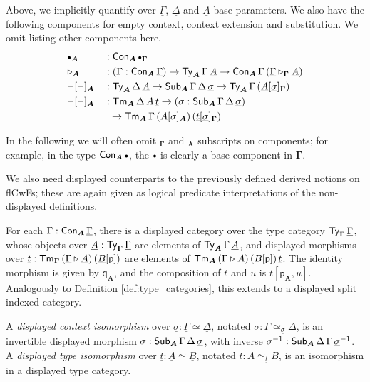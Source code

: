 \documentclass[sigplan,review,anonymous]{acmart}\settopmatter{printfolios=true,printccs=false,printacmref=false}
\newcommand{\ext}{\triangleright}
\newcommand{\emptycon}{\scaleobj{.75}\bullet}
\newcommand{\p}{\mathsf{p}}
\newcommand{\q}{\mathsf{q}}
\newcommand{\bGamma}{\boldsymbol{\Gamma}}
\newcommand{\bA}{\boldsymbol{A}}
\newcommand{\ul}[1]{\underline{#1}}
\newcommand{\ulGamma}{\ul{\Gamma}}
\newcommand{\ulDelta}{\ul{\Delta}}
\newcommand{\ulsigma}{\ul{\sigma}}
\newcommand{\ult}{\ul{t}}
\newcommand{\ulA}{\ul{A}}
\newcommand{\ulB}{\ul{B}}
\begin{document}
\begin{definition}
Above, we implicitly quantify over $\ulGamma$, $\ulDelta$ and $\ulA$ base
parameters. We also have the following components for empty context, context
extension and substitution. We omit listing other components here.
\begin{alignat*}{3}
  & \emptycon_{\bA} && : \Con_{\bA}\,\emptycon_{\bGamma}\\
  & \ext_{\bA}      && : (\Gamma : \Con_{\bA}\,\ulGamma)\ra \Ty_{\bA}\,\Gamma\,\ulA \ra
                     \Con_{\bA}\,\Gamma\,(\ulGamma \ext_{\bGamma} \ulA)\\
  & \blank[\blank]_{\bA} && : \Ty_{\bA}\,\Delta\,\ulA \ra \Sub_{\bA}\,\Gamma\,\Delta\,\ulsigma
                     \ra \Ty_{\bA}\,\Gamma\, (\ulA[\ulsigma]_{\bGamma})\\
  & \blank[\blank]_{\bA} && : \Tm_{\bA}\,\Delta\,A\,\ult \ra (\sigma : \Sub_{\bA}\,\Gamma\,\Delta\,\ulsigma)\\
  & && \hspace{0.5em}\ra \Tm_{\bA}\,\Gamma\, (A[\sigma]_{\bA})\,(\ult[\ulsigma]_{\bGamma})
\end{alignat*}
\end{definition}

In the following we will often omit $_{\bGamma}$ and $_{\bA}$ subscripts on
components; for example, in the type $\Con_{\bA}\,\emptycon$, the $\emptycon$ is clearly
a base component in $\bGamma$.

We also need displayed counterparts to the previously defined derived notions on flCwFs;
these are again given as logical predicate interpretations of the non-displayed definitions.

\begin{definition} For each $\Gamma : \Con_{\bA}\,\ulGamma$, there
is a displayed category over the type category $\Ty_{\bGamma}\,\ulGamma$, whose objects
over $\ulA : \Ty_{\bGamma}\,\ulGamma$ are elements of $\Ty_{\bA}\,\Gamma\,\ulA$, and displayed morphisms over $\ult : \Tm_{\bGamma}\,(\ulGamma \ext \ulA)\,(\ulB[\p])$ are elements of $\Tm_{\bA}\,(\Gamma \ext A)\,(B[\p])\,\ult$. The identity morphism is given by $\q_{\bA}$, and the composition of $t$ and $u$ is $t[\p_{\bA},u]$. Analogously to Definition \ref{def:type_categories}, this extends to a displayed split indexed category.
\end{definition}

\begin{definition} A \emph{displayed context isomorphism} over $\ulsigma : \ulGamma \simeq \ulDelta$, notated $\sigma : \Gamma \simeq_{\ulsigma} \Delta$, is an invertible displayed morphism $\sigma : \Sub_{\bA}\,\Gamma\,\Delta\,\ulsigma$, with inverse $\sigma^{-1} : \Sub_{\bA}\,\Delta\,\Gamma\,\ulsigma^{-1}$. A \emph{displayed type isomorphism} over $\ult : \ulA \simeq \ulB$, notated $t : A \simeq_{\ult} B$, is an isomorphism in a displayed type category.
\end{definition}
\end{document}
